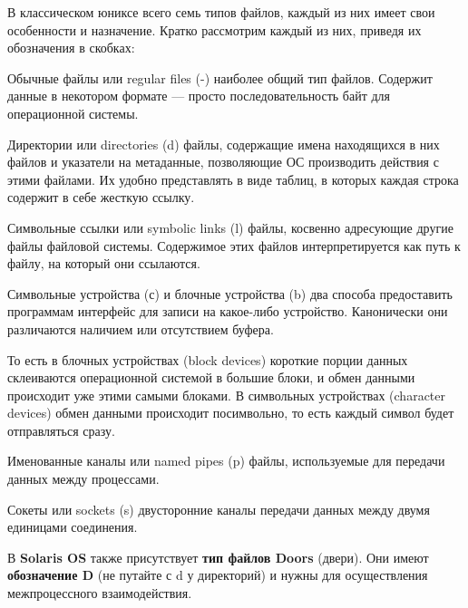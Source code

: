 В классическом юниксе всего семь типов файлов, каждый из них имеет свои особенности и назначение. Кратко рассмотрим каждый из них, приведя их обозначения в скобках:

\begin{defi}{Обычные файлы или regular files (-)}	
	наиболее общий тип файлов. Содержит данные в некотором формате --- просто последовательность байт для операционной системы.
\end{defi}

\begin{defi}{Директории или directories (d)}
	файлы, содержащие имена находящихся в них файлов и указатели на метаданные, позволяющие ОС производить действия с этими файлами. Их удобно представлять в виде таблиц, в которых каждая строка содержит в себе жесткую ссылку.
\end{defi}

\begin{defi}{Символьные ссылки или symbolic links (l)}
	файлы, косвенно адресующие другие файлы файловой системы. Содержимое этих файлов интерпретируется как путь к файлу, на который они ссылаются.
\end{defi}

\begin{defi}{Символьные устройства (с) и блочные устройства (b)}
	два способа предоставить программам интерфейс для записи на какое-либо устройство. Канонически они различаются наличием или отсутствием буфера. 
	
	То есть в блочных устройствах (block devices) короткие порции данных склеиваются операционной системой в большие блоки, и обмен данными происходит уже этими самыми блоками. В символьных устройствах (character devices) обмен данными происходит посимвольно, то есть каждый символ будет отправляться сразу.
\end{defi}

\begin{defi}{Именованные каналы или named pipes (p)}
	файлы, используемые для передачи данных между процессами.
\end{defi}

\begin{defi}{Сокеты или sockets (s)}
	двусторонние каналы передачи данных между двумя единицами соединения.
\end{defi}

В \textbf{Solaris OS} также присутствует \textbf{тип файлов Doors} (двери). Они имеют \textbf{обозначение D} (не путайте с d у директорий) и нужны для осуществления межпроцессного взаимодействия.
